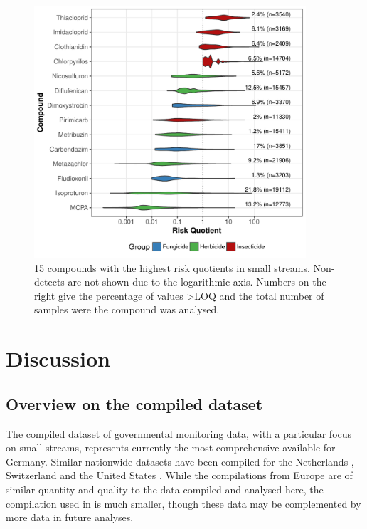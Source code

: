 \begin{figure}[H]
  \includegraphics[width=0.9\textwidth]{chapters/smallstreams/figure6.pdf}
  \caption[15 compounds with the highest risk quotients in small streams.]{15 compounds with the highest risk quotients in small streams. Non-detects are not shown due to the logarithmic axis. Numbers on the right give the percentage of values \textgreater LOQ and the total number of samples were the compound was analysed.
  }
  \label{fig:ss:fig6}
\end{figure}




\clearpage
\section{Discussion}
\subsection{Overview on the compiled dataset}
The compiled dataset of governmental monitoring data, with a particular focus on small streams, represents currently the most comprehensive available for Germany.
Similar nationwide datasets have been compiled for the Netherlands \citep{vijver_spatial_2008}, Switzerland \citep{munz_pestizidmessungen_2011} and the United States \citep{stone2014pesticides}.
While the compilations from Europe are of similar quantity and quality to the  data compiled and analysed here, the compilation used in \citet{stone2014pesticides} is much smaller, though these data may be complemented by more data in future analyses. 

